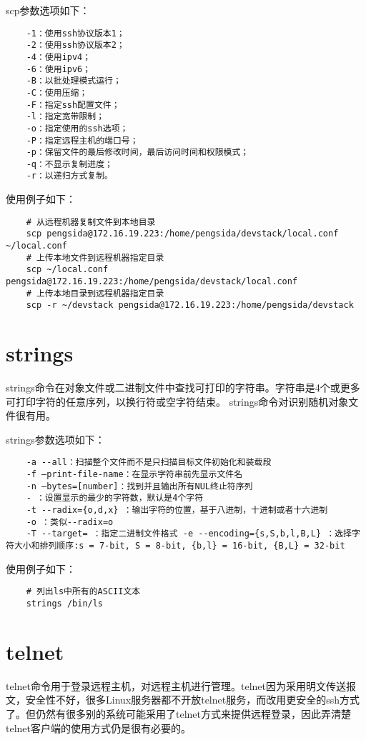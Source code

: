 \documentclass[a4paper,left=2.5cm,right=2.5cm,11pt]{article}
\begin{document}
	scp参数选项如下：
	\begin{lstlisting}
	-1：使用ssh协议版本1； 
	-2：使用ssh协议版本2； 
	-4：使用ipv4； 
	-6：使用ipv6； 
	-B：以批处理模式运行； 
	-C：使用压缩； 
	-F：指定ssh配置文件； 
	-l：指定宽带限制； 
	-o：指定使用的ssh选项； 
	-P：指定远程主机的端口号； 
	-p：保留文件的最后修改时间，最后访问时间和权限模式； 
	-q：不显示复制进度； 
	-r：以递归方式复制。
	\end{lstlisting}

	使用例子如下：
	\begin{lstlisting}
	# 从远程机器复制文件到本地目录
	scp pengsida@172.16.19.223:/home/pengsida/devstack/local.conf ~/local.conf
	# 上传本地文件到远程机器指定目录
	scp ~/local.conf pengsida@172.16.19.223:/home/pengsida/devstack/local.conf
	# 上传本地目录到远程机器指定目录
	scp -r ~/devstack pengsida@172.16.19.223:/home/pengsida/devstack
	\end{lstlisting}

\section{strings}
	strings命令在对象文件或二进制文件中查找可打印的字符串。字符串是4个或更多可打印字符的任意序列，以换行符或空字符结束。 strings命令对识别随机对象文件很有用。\par

	strings参数选项如下：
	\begin{lstlisting}
	-a --all：扫描整个文件而不是只扫描目标文件初始化和装载段 
	-f –print-file-name：在显示字符串前先显示文件名 
	-n –bytes=[number]：找到并且输出所有NUL终止符序列 
	- ：设置显示的最少的字符数，默认是4个字符 
	-t --radix={o,d,x} ：输出字符的位置，基于八进制，十进制或者十六进制 
	-o ：类似--radix=o 
	-T --target= ：指定二进制文件格式 -e --encoding={s,S,b,l,B,L} ：选择字符大小和排列顺序:s = 7-bit, S = 8-bit, {b,l} = 16-bit, {B,L} = 32-bit
	\end{lstlisting}

	使用例子如下：
	\begin{lstlisting}
	# 列出ls中所有的ASCII文本
	strings /bin/ls
	\end{lstlisting}

\section{telnet}
	telnet命令用于登录远程主机，对远程主机进行管理。telnet因为采用明文传送报文，安全性不好，很多Linux服务器都不开放telnet服务，而改用更安全的ssh方式了。但仍然有很多别的系统可能采用了telnet方式来提供远程登录，因此弄清楚telnet客户端的使用方式仍是很有必要的。\par
\end{document}

